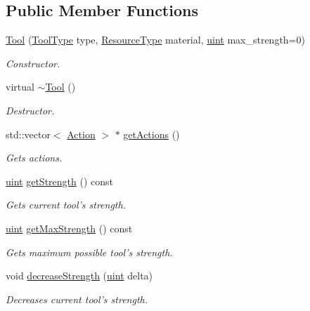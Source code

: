 \subsection*{Public Member Functions}
\begin{DoxyCompactItemize}
\item 
\hyperlink{classTool_aa21c7e32c4978b4f7d2f908f18fee2e8}{Tool} (\hyperlink{BasicTypes_8h_a38675390df8e0ebbab2867be799b7160}{Tool\-Type} type, \hyperlink{BasicTypes_8h_a8571efa4409be32e28abf3ea74a0dbb1}{Resource\-Type} material, \hyperlink{BasicTypes_8h_a91ad9478d81a7aaf2593e8d9c3d06a14}{uint} max\-\_\-strength=0)
\begin{DoxyCompactList}\small\item\em Constructor. \end{DoxyCompactList}\item 
virtual \hyperlink{classTool_a44634ea099b7a49acf87f50e072ce660}{$\sim$\-Tool} ()
\begin{DoxyCompactList}\small\item\em Destructor. \end{DoxyCompactList}\item 
std\-::vector$<$ \hyperlink{classAction}{Action} $>$ $\ast$ \hyperlink{classTool_a022fd16d7301835eff8324ef8447d90c}{get\-Actions} ()
\begin{DoxyCompactList}\small\item\em Gets actions. \end{DoxyCompactList}\item 
\hyperlink{BasicTypes_8h_a91ad9478d81a7aaf2593e8d9c3d06a14}{uint} \hyperlink{classTool_a5f03c710495f2d1f0714427e0c8a742c}{get\-Strength} () const 
\begin{DoxyCompactList}\small\item\em Gets current tool's strength. \end{DoxyCompactList}\item 
\hyperlink{BasicTypes_8h_a91ad9478d81a7aaf2593e8d9c3d06a14}{uint} \hyperlink{classTool_aba9c408fcfa03c41300d0ba26da25e8f}{get\-Max\-Strength} () const 
\begin{DoxyCompactList}\small\item\em Gets maximum possible tool's strength. \end{DoxyCompactList}\item 
void \hyperlink{classTool_ac8e4a7675142aac8624c18ea6e182cd1}{decrease\-Strength} (\hyperlink{BasicTypes_8h_a91ad9478d81a7aaf2593e8d9c3d06a14}{uint} delta)
\begin{DoxyCompactList}\small\item\em Decreases current tool's strength. \end{DoxyCompactList}\item 

\end{DoxyCompactItemize}
